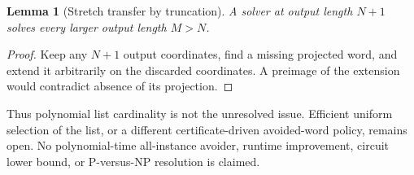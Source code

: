 \documentclass[11pt]{article}
\newtheorem{lemma}{Lemma}
\begin{document}
\begin{lemma}[Stretch transfer by truncation]
A solver at output length $N+1$ solves every larger output length $M>N$.
\end{lemma}

\begin{proof}
Keep any $N+1$ output coordinates, find a missing projected word, and extend it
arbitrarily on the discarded coordinates.  A preimage of the extension would
contradict absence of its projection.
\end{proof}

Thus polynomial list cardinality is not the unresolved issue.  Efficient
uniform selection of the list, or a different certificate-driven avoided-word
policy, remains open.  No polynomial-time all-instance avoider, runtime
improvement, circuit lower bound, or P-versus-NP resolution is claimed.
\end{document}
